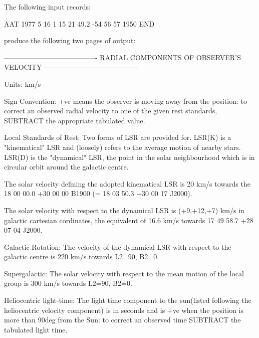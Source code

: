 \documentclass[11pt,noabs,nolof]{starlink}
\newenvironment{verysmall}{\begin{scriptsize}}{\end{scriptsize}}
\begin{document}
The following input records:

\begin{terminalv}
AAT
1977 5 16   1
15 21 49.2  -54 56 57  1950
END
\end{terminalv}

produce the following two pages of output:

\vspace{10mm}


\begin{verysmall}
\begin{terminalv}
----------------------------------------
RADIAL COMPONENTS OF OBSERVER'S VELOCITY
----------------------------------------

Units: km/s

Sign Convention:
  +ve means the observer is moving away from the position:  to correct
  an observed radial velocity to one of the given rest standards,
  SUBTRACT the appropriate tabulated value.

Local Standards of Rest:
  Two forms of LSR are provided for.  LSR(K) is a "kinematical" LSR and
  (loosely) refers to the average motion of nearby stars.  LSR(D) is the
  "dynamical" LSR, the point in the solar neighbourhood which is in
  circular orbit around the galactic centre.

  The solar velocity defining the adopted kinematical LSR is 20 km/s
  towards the 18 00 00.0 +30 00 00 B1900 (= 18 03 50.3 +30 00 17 J2000).

  The solar velocity with respect to the dynamical LSR is (+9,+12,+7) km/s
  in galactic cartesian cordinates, the equivalent of 16.6 km/s towards
  17 49 58.7 +28 07 04 J2000.

Galactic Rotation:
  The velocity of the dynamical LSR with respect to the galactic centre is
  220 km/s towards L2=90, B2=0.

Supergalactic:
  The solar velocity with respect to the mean motion of the local group is
  300 km/s towards L2=90, B2=0.

Heliocentric light-time:
  The light time component to the sun(listed following the heliocentric
  velocity component) is in seconds and is +ve when the position is more
  than 90deg from the Sun: to correct an observed time SUBTRACT the
  tabulated light time.
\end{terminalv}
\end{verysmall}
\newpage
\end{document}
